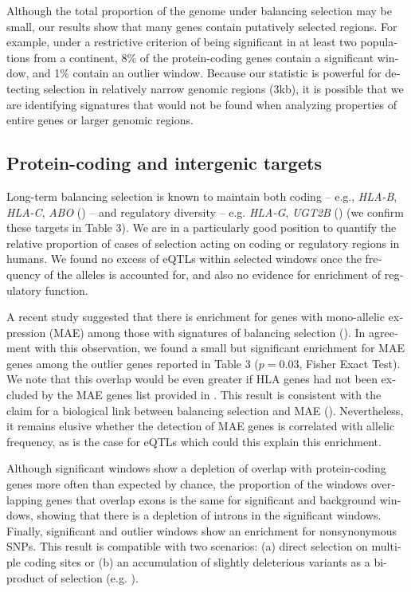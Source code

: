 \begin{refsection}
\begin{otherlanguage}{english}
Although the total proportion of the genome under balancing selection may be small, our results show that many genes contain putatively selected regions. For example, under a restrictive criterion of being significant in at least two populations from a continent, 8\% of the protein-coding genes contain a significant window, and 1\% contain an outlier window. Because our statistic is powerful for detecting selection in relatively narrow genomic regions (3kb), it is possible that we are identifying signatures that would not be found when analyzing properties of entire genes or larger genomic regions.

\subsection{Protein-coding and intergenic targets}
Long-term balancing selection is known to maintain both coding -- e.g., \emph{HLA-B}, \emph{HLA-C}, \emph{ABO}
(\cite{Hughes1988,Hughes1989,Segurel2012,Segurel2013}) -- and regulatory diversity -- e.g. \emph{HLA-G}, \emph{UGT2B} (\cite{Tan2005,Sun2011}) (we confirm these targets in Table 3). We are in a particularly good position to quantify the relative proportion of cases of selection acting on coding or regulatory regions in humans. We found no excess of eQTLs within selected windows once the frequency of the alleles is accounted for, and also no evidence for enrichment of regulatory function.

A recent study suggested that there is enrichment for genes with mono-allelic expression (MAE) among those with signatures of balancing selection (\cite{Savova2016}). In agreement with this observation, we found a small but significant enrichment for MAE genes among the outlier genes reported in Table 3 ($p=0.03$, Fisher Exact Test). We note that this overlap would be even
greater if HLA genes had not been excluded by the MAE genes list provided in \textcite{Savova2016}. This result is consistent with the claim for a biological link between balancing selection and MAE
(\cite{Savova2016}). Nevertheless, it remains elusive whether the detection of MAE genes is correlated with allelic frequency, as is the case for eQTLs which could this explain this enrichment.

Although significant windows show a depletion of overlap with protein-coding genes more often than expected by chance, the proportion of the windows overlapping genes that overlap exons is the same for significant and background windows, showing that there is a depletion of introns in the significant windows. Finally, significant and outlier windows show an enrichment for
nonsynonymous SNPs. This result is compatible with two scenarios: (a) direct selection on multiple coding sites or (b) an accumulation of slightly deleterious variants as a bi-product of selection (e.g. \cite{Chun2011}).





\end{otherlanguage}
\end{refsection}
